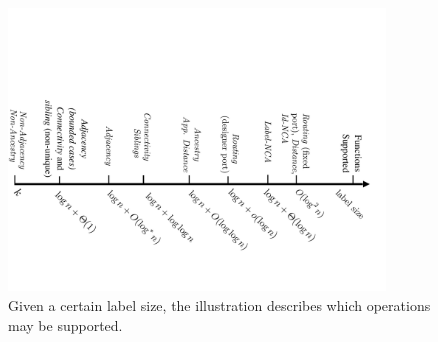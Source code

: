 				\begin{figure}
				\centering
				\includegraphics[width=100mm]{./Figures/Hierarchy2.pdf}
				\caption{Given a certain label size, the illustration describes  which operations may be  supported.  }
				\label{fig:complexityruler}
			\end{figure}
			


